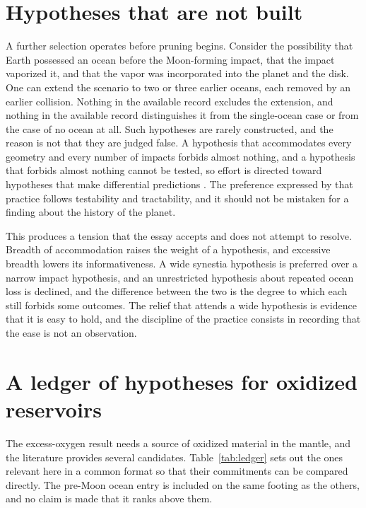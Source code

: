 \documentclass[11pt]{article}
\begin{document}
\section{Hypotheses that are not built}

A further selection operates before pruning begins. Consider the possibility that Earth possessed an ocean before the Moon-forming impact, that the impact vaporized it, and that the vapor was incorporated into the planet and the disk. One can extend the scenario to two or three earlier oceans, each removed by an earlier collision. Nothing in the available record excludes the extension, and nothing in the available record distinguishes it from the single-ocean case or from the case of no ocean at all. Such hypotheses are rarely constructed, and the reason is not that they are judged false. A hypothesis that accommodates every geometry and every number of impacts forbids almost nothing, and a hypothesis that forbids almost nothing cannot be tested, so effort is directed toward hypotheses that make differential predictions \cite{popper1959}. The preference expressed by that practice follows testability and tractability, and it should not be mistaken for a finding about the history of the planet.

This produces a tension that the essay accepts and does not attempt to resolve. Breadth of accommodation raises the weight of a hypothesis, and excessive breadth lowers its informativeness. A wide synestia hypothesis is preferred over a narrow impact hypothesis, and an unrestricted hypothesis about repeated ocean loss is declined, and the difference between the two is the degree to which each still forbids some outcomes. The relief that attends a wide hypothesis is evidence that it is easy to hold, and the discipline of the practice consists in recording that the ease is not an observation.

\section{A ledger of hypotheses for oxidized reservoirs}

The excess-oxygen result needs a source of oxidized material in the mantle, and the literature provides several candidates. Table~\ref{tab:ledger} sets out the ones relevant here in a common format so that their commitments can be compared directly. The pre-Moon ocean entry is included on the same footing as the others, and no claim is made that it ranks above them.
\end{document}
